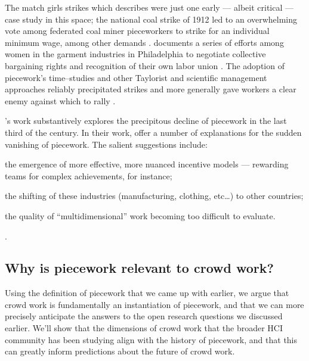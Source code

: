 \documentclass[trackingWork]{subfiles}
\begin{document}
The match girls strikes which \citeauthor{10.2307/3827491} describes were just one early
--- albeit critical ---
case study in this space;
the national coal strike of 1912 led to an overwhelming vote among federated coal miner pieceworkers
to strike for
an individual minimum wage, among other demands
\cite{10.2307/2221944}.
\citeauthor{10.2307/41829256} documents a series of efforts among women in the garment industries in Philadelphia to negotiate collective bargaining rights and recognition of their own labor union
\cite{10.2307/41829256}.
The adoption of piecework's time--studies and other Taylorist and scientific management approaches reliably precipitated strikes and more generally gave workers a clear enemy against which to rally
\cite{jacoby1983union}.

\citeauthor{hart2013rise}'s work substantively explores the precipitous decline of piecework in the last third of the  century.
In their work, \citeauthor{hart2013rise} offer a number of explanations for the sudden vanishing of piecework.
The salient suggestions include:
\begin{inlinelist}
\item the emergence of more effective, more nuanced incentive models
--- rewarding teams for complex achievements, for instance;
\item the shifting of these industries (manufacturing, clothing, etc\dots)
to other countries;
\item the quality of ``multidimensional'' work becoming too difficult to evaluate.
\end{inlinelist}
\cite{hart2013rise}.



\subsection{Why is piecework relevant to crowd work?}

Using the definition of piecework that we came up with earlier, we argue that
crowd work is fundamentally an instantiation of piecework, and
that we can more precisely anticipate the answers to the open research questions we discussed earlier.
We'll show that the dimensions of crowd work that the broader HCI community has been studying
align with the history of piecework, and that this can greatly inform predictions about the future of crowd work.
\end{document}
